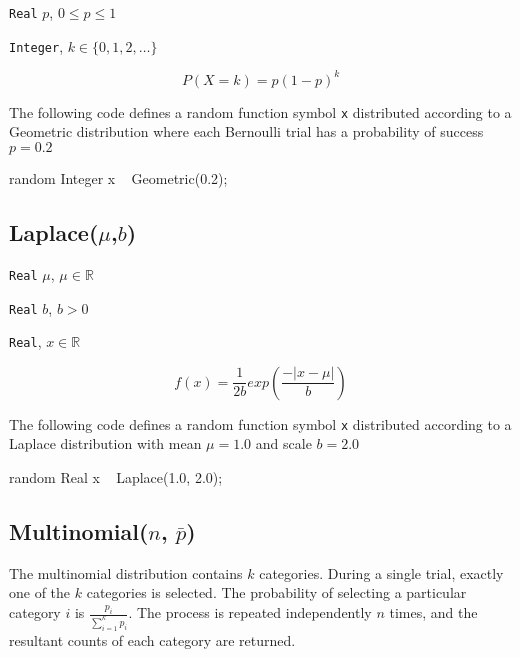 \begin{itemize*}
\item[] \verb|Real|
 $p$, $0 \leq p \leq 1$ 
\end{itemize*}

\begin{itemize*}
\item[] \verb|Integer|, $k \in \{0, 1, 2, \ldots \}$ 
\end{itemize*}

\[
	P(X = k) = p(1-p)^{k}
\]

The following code defines a random function symbol \verb|x| distributed according to a Geometric distribution where each Bernoulli trial has a probability of success $p = 0.2$
\begin{blogcode}
random Integer x ~ Geometric(0.2);
\end{blogcode}

\subsection{Laplace($\mu$,$b$)}

\begin{itemize*}
\item[] \verb|Real| $\mu$, $\mu \in \mathbb{R}$
\item[] \verb|Real| $b$, $b > 0$
 
\end{itemize*}

\begin{itemize*}
\item[] \verb|Real|, $x \in \mathbb{R}$ 
\end{itemize*}

\[
	f(x) = \frac{1}{2b} exp(\frac{-|x-\mu|}{b})
\]

The following code defines a random function symbol \verb|x| distributed according to a Laplace distribution with mean $\mu = 1.0$ and scale $b = 2.0$
\begin{blogcode}
random Real x ~ Laplace(1.0, 2.0);
\end{blogcode}


\subsection{Multinomial($n$, $\bar{p}$)}
 The multinomial distribution contains $k$ categories. During a single trial, exactly one of the $k$ categories is selected. The probability of selecting a particular category $i$ is $\frac{p_{i}}{\sum_{i=1}^{k} p_{i}}$. The process is repeated independently $n$ times, and the resultant counts of each category are returned.
 

